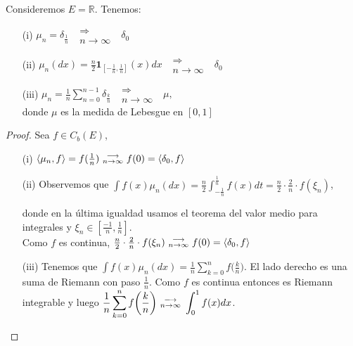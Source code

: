 \begin{example}[\label{ejemplo:1_2_1}] 
Consideremos $E=\mathbb{R}$. Tenemos: 
\begin{itemize} %
    \item[(i)] $\mu_n=\delta_{\frac{1}{n}} \mbox{ }\substack{\Longrightarrow \\n \to \infty}\mbox{ } \delta_0$ 
    \item[(ii)] $\displaystyle\mu_n(dx) = \frac{n}{2}\mathbf{1}_{[-\frac{1}{n},\frac{1}{n}]}(x)dx \mbox{ }\substack{\Longrightarrow \\n \to \infty}\mbox{ } \delta_0$
    \item[(iii)] $\displaystyle\mu_n=\frac{1}{n}\sum_{n=0}^{n-1}\delta_{\frac{k}{n}} \mbox{ }\substack{\Longrightarrow \\n \to \infty}\mbox{ } \mu, $ %
    \\ donde $\mu$ es la medida de Lebesgue en $[0,1]$
\end{itemize}
\end{example}
\begin{proof}
\gris Sea $f\in C_b(E)$, %
\begin{itemize}
    \item[(i)] $\langle \mu_n,f\rangle=f(\frac{1}{n})\mbox{ }\substack{\longrightarrow \\ n\to\infty}\mbox{ } f(0)=\langle \delta_0,f\rangle$
    \item[(ii)] Observemos que 
    $\displaystyle\int f(x)\mu_n(dx)=\frac{n}{2}\int^{\frac{1}{n}}_{-\frac{1}{n}}f(x)dt = \frac{n}{2}\cdot\frac{2}{n}\cdot f(\xi_n)$,
    
    donde en la última igualdad usamos el teorema del valor medio para integrales y $\xi_n\in[\frac{-1}{n},\frac{1}{n}]$.
    \\ Como $f$ es continua, $\frac{n}{2}\cdot\frac{2}{n}\cdot f(\xi_n) \mbox{ }\substack{\longrightarrow \\ n\to\infty}\mbox{ } f(0)=\langle \delta_0,f \rangle$
    \item[(iii)] Tenemos que $\displaystyle\int f(x)\mu_n(dx) = \frac{1}{n}\sum^n_{k=0}f\bigg(\frac{k}{n}\bigg)$. El lado derecho es una suma de Riemann con paso $\frac{1}{n}$. Como $f$ es continua entonces es Riemann integrable y luego $\displaystyle \frac{1}{n}\sum^n_{k=0}f\bigg(\frac{k}{n}\bigg) \mbox{ }\substack{\longrightarrow \\ n\to\infty}\mbox{ } \int_0^1 f(x)dx$.
\end{itemize} 
\findem
\negro \end{proof}

